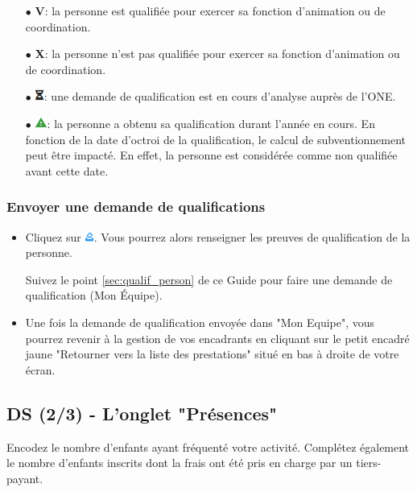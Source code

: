 \begin{itemize}
    \item [$\bullet$]\textbf{\textcolor{bleu}{V}}: la personne est qualifiée pour exercer sa fonction d'animation ou de coordination. 
    \item [$\bullet$]\textbf{\textcolor{rouge}{X}}: la personne n'est pas qualifiée pour exercer sa fonction d'animation ou de coordination. 
    \item [$\bullet$]\includegraphics[width=0.3cm]{Images/icon/icon_sablier.png}: une demande de qualification est en cours d'analyse auprès de l'ONE. 
    \item [$\bullet$]\includegraphics[width=0.4cm]{Images/icon/icon_attention.png}: la personne a obtenu sa qualification durant l'année en cours. En fonction de la date d'octroi de la qualification, le calcul de subventionnement peut être impacté. En effet, la personne est considérée comme non qualifiée avant cette date. 
\end{itemize}
\vspace*{3mm}


\subsubsection{Envoyer une demande de qualifications}
\begin{itemize}
    \item Cliquez sur \includegraphics[width=0.3cm]{Images/icon/button_dmd_qualif.png}. Vous pourrez alors renseigner les preuves de qualification de la personne.
        \begin{conseil}
        Suivez le point \ref{sec:qualif_person} de ce Guide pour faire une demande de qualification (Mon Équipe). 
        \end{conseil}
    \item Une fois la demande de qualification envoyée dans "Mon Equipe", vous pourrez revenir à la gestion de vos encadrants en cliquant sur le petit encadré jaune "Retourner vers la liste des prestations" situé en bas à droite de votre écran. 
\end{itemize}

 
\subsection{DS (2/3) - L'onglet "Présences"}\label{pad_présence}
Encodez le nombre d'enfants ayant fréquenté votre activité. Complétez également le nombre d'enfants inscrits dont la frais ont été pris en charge par un tiers-payant.


